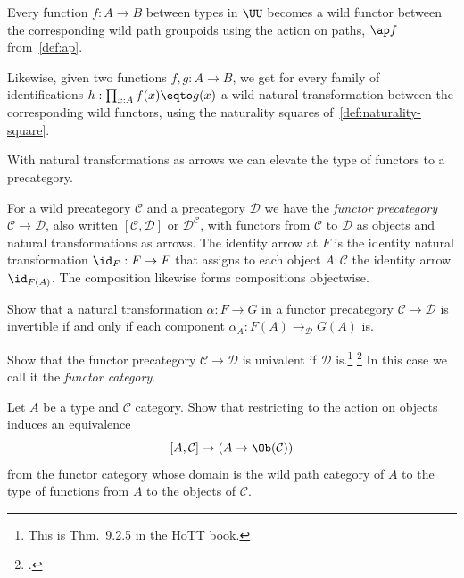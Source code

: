 \begin{example}\label{ex:path-gpd-nat}
  Every function $f : A \to B$ between types in $\UU$
  becomes a wild functor between the corresponding wild path groupoids
  using the action on paths, $\ap f$ from~\cref{def:ap}.

  Likewise, given two functions $f,g : A \to B$, we get for
  every family of identifications $h : \prod_{x:A} f(x) \eqto g(x)$
  a wild natural transformation between the corresponding wild functors,
  using the naturality squares of~\cref{def:naturality-square}.
\end{example}

With natural transformations as arrows we can elevate the
type of functors to a precategory.
\begin{definition}\label{def:functor-cat}
  For a wild precategory $\mathcal C$ and a precategory $\mathcal D$
  we have the \emph{functor precategory}%
  $\mathcal C \to \mathcal D$, also written
  $[\mathcal C,\mathcal D]$ or $\mathcal D^{\mathcal C}$, %
  with functors from $\mathcal C$ to $\mathcal D$ as objects
  and natural transformations as arrows.
  The identity arrow at $F$ is the identity natural transformation
  $\id_F: F \to F$ that assigns to each object $A:\mathcal C$ the identity
  arrow $\id_{F(A)}$.
  The composition likewise forms compositions objectwise.
\end{definition}
\begin{xca}\label{xca:funext-nat-trans}
  Show that a natural transformation $\alpha : F \to G$
  in a functor precategory $\mathcal C\to\mathcal D$
  is invertible if and only if
  each component $\alpha_A : F(A) \to_{\mathcal D} G(A)$ is.
\end{xca}
\begin{xca}\label{xca:functor-cat-univalent}
  Show that the functor precategory $\mathcal C\to\mathcal D$
  is univalent if $\mathcal D$ is.\footnote{%
    This is Thm.~9.2.5 in the HoTT book\footnotemark{}.}%
  \footcitetext{hottbook}
  In this case we call it the \emph{functor category}.
\end{xca}
\begin{xca}\label{xca:path-core-adj}
  Let $A$ be a type and $\mathcal C$ category.
  Show that restricting to the action on objects
  induces an equivalence
  \[
    [A, \mathcal C] \to (A \to \Ob(\mathcal C))
  \]
  from the functor category whose domain is the wild path category of $A$
  to the type of functions from $A$ to the objects of $\mathcal C$.
\end{xca}

